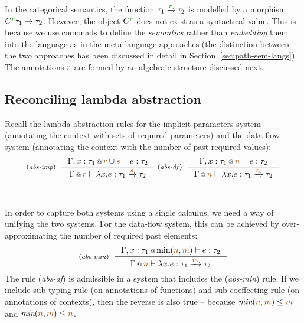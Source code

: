 In the categorical semantics, the function $\tau_1 \xrightarrow{\cclrd{r}} \tau_2$ is modelled
by a morphism $C^{\cclrd{r}} \tau_1 \rightarrow \tau_2$. However, the object $C^{\cclrd{r}}$
does not exist as a syntactical value. This is because we use comonads to define the 
\emph{semantics} rather than \emph{embedding} them into the language as in the meta-language
approaches (the distinction between the two approaches has been discussed in detail in 
Section~\ref{sec:path-sem-langs}). The annotations $\cclrd{r}$ are formed by an algebraic
structure discussed next.


\subsection{Reconciling lambda abstraction}
\label{sec:flat-calculus-lambda}

Recall the lambda abstraction rules for the implicit parameters system (annotating the context
with sets of required parameters) and the data-flow system (annotating the context with the
number of past required values):
%
\begin{equation*}
\tyrule{abs-imp}
  {\coctx{\Gamma, x:\tau_1}{\aclrd{r} \cup \aclrd{s}} \vdash e : \tau_2}
  {\coctx{\Gamma}{\aclrd{r}} \vdash \lambda x.e : \tau_1 \xrightarrow{\aclrd{s}} \tau_2 }
\;
\tyrule{abs-df}
  {\coctx{\Gamma, x:\tau_1}{\aclrd{n}} \vdash e : \tau_2}
  {\coctx{\Gamma}{\aclrd{n}} \vdash \lambda x.e : \tau_1 \xrightarrow{\aclrd{n}} \tau_2 }
\end{equation*}

~

In order to capture both systems using a single calculus, we need a way of unifying the two
systems. For the data-flow system, this can be achieved by over-approximating the number of 
required past elements:
%
\begin{equation*}
\tyrule{abs-min}
  {\coctx{\Gamma, x:\tau_1}{\textnormal{min}(\aclrd{n}, \aclrd{m})} \vdash e : \tau_2}
  {\coctx{\Gamma}{\aclrd{n}} \vdash \lambda x.e : \tau_1 \xrightarrow{\aclrd{m}} \tau_2 }
\end{equation*}
%
The rule (\emph{abs-df}) is admissible in a system that includes the (\emph{abs-min}) rule. 
If we include sub-typing rule (on annotations of functions) and sub-coeffecting rule (on 
annotations of contexts), then the reverse is also true -- because 
$\textit{min}(\aclrd{n}, \aclrd{m}) \leq \aclrd{m}$ and $\textit{min}(\aclrd{n}, \aclrd{m}) \leq \aclrd{n}$.

